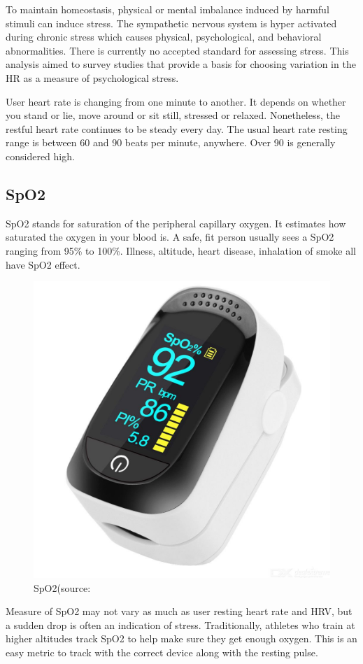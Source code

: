 To maintain homeostasis, physical or mental imbalance induced by harmful stimuli can induce stress. The sympathetic nervous system is hyper activated during chronic stress which causes physical, psychological, and behavioral abnormalities. There is currently no accepted standard for assessing stress. This analysis aimed to survey studies that provide a basis for choosing variation in the \acf{HR} as a measure of psychological stress.\citep{Kim2018StressLiterature}

User heart rate is changing from one minute to another. It depends on whether you stand or lie, move around or sit still, stressed or relaxed. Nonetheless, the restful heart rate continues to be steady every day. The usual heart rate resting range is between 60 and 90 beats per minute, anywhere. Over 90 is generally considered high.\citep{LeWine2011IncreasePublishing}
\subsection{\acf{SpO2}}
\acs{SpO2} stands for saturation of the peripheral capillary oxygen. It estimates how saturated the oxygen in your blood is. A safe, fit person usually sees a \acs{SpO2} ranging from 95\% to 100\%. Illness, altitude, heart disease, inhalation of smoke all have \acs{SpO2} effect.\citep{Sly2019ManagingBiostrap}
\begin{figure}[hbt!] 
  \centering
  \includegraphics[width=0.5\linewidth]{chap4/image4/spo22.jpg}
  \caption[\acf{SpO2}]{\acf{SpO2}(source:\cite{Teleportz2019A2Shop}}
  \label{fig:spo2}
\end{figure}
 Measure of \acs{SpO2} may not vary as much as user resting heart rate and HRV, but a sudden drop is often an indication of stress. Traditionally, athletes who train at higher altitudes track \acs{SpO2} to help make sure they get enough oxygen. This is an easy metric to track with the correct device along with the resting pulse.

